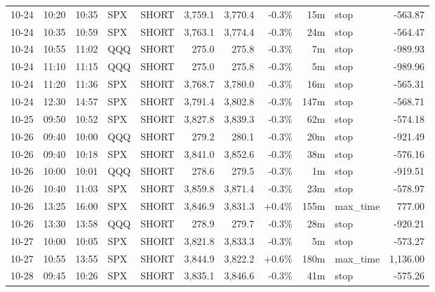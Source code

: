 \documentclass[11pt,a4paper,twoside]{article}
\begin{document}
\begin{center}
\begin{longtable}{>{\color{txtmain}}l l l l l r r r r >{\color{txtmain}}l r}
10-24 & 10:20 & 10:35 & SPX & SHORT & 3,759.1 & 3,770.4 & \textcolor{lossred}{-0.3\%} & 15m & stop & \textcolor{lossred}{-563.87} \\
10-24 & 10:35 & 10:59 & SPX & SHORT & 3,763.1 & 3,774.4 & \textcolor{lossred}{-0.3\%} & 24m & stop & \textcolor{lossred}{-564.47} \\
10-24 & 10:55 & 11:02 & QQQ & SHORT & 275.0 & 275.8 & \textcolor{lossred}{-0.3\%} & 7m & stop & \textcolor{lossred}{-989.93} \\
10-24 & 11:10 & 11:15 & QQQ & SHORT & 275.0 & 275.8 & \textcolor{lossred}{-0.3\%} & 5m & stop & \textcolor{lossred}{-989.96} \\
10-24 & 11:20 & 11:36 & SPX & SHORT & 3,768.7 & 3,780.0 & \textcolor{lossred}{-0.3\%} & 16m & stop & \textcolor{lossred}{-565.31} \\
10-24 & 12:30 & 14:57 & SPX & SHORT & 3,791.4 & 3,802.8 & \textcolor{lossred}{-0.3\%} & 147m & stop & \textcolor{lossred}{-568.71} \\
10-25 & 09:50 & 10:52 & SPX & SHORT & 3,827.8 & 3,839.3 & \textcolor{lossred}{-0.3\%} & 62m & stop & \textcolor{lossred}{-574.18} \\
10-26 & 09:40 & 10:00 & QQQ & SHORT & 279.2 & 280.1 & \textcolor{lossred}{-0.3\%} & 20m & stop & \textcolor{lossred}{-921.49} \\
10-26 & 09:40 & 10:18 & SPX & SHORT & 3,841.0 & 3,852.6 & \textcolor{lossred}{-0.3\%} & 38m & stop & \textcolor{lossred}{-576.16} \\
10-26 & 10:00 & 10:01 & QQQ & SHORT & 278.6 & 279.5 & \textcolor{lossred}{-0.3\%} & 1m & stop & \textcolor{lossred}{-919.51} \\
10-26 & 10:40 & 11:03 & SPX & SHORT & 3,859.8 & 3,871.4 & \textcolor{lossred}{-0.3\%} & 23m & stop & \textcolor{lossred}{-578.97} \\
10-26 & 13:25 & 16:00 & SPX & SHORT & 3,846.9 & 3,831.3 & \textcolor{wingreen}{+0.4\%} & 155m & max\_time & \textcolor{wingreen}{777.00} \\
10-26 & 13:30 & 13:58 & QQQ & SHORT & 278.9 & 279.7 & \textcolor{lossred}{-0.3\%} & 28m & stop & \textcolor{lossred}{-920.21} \\
10-27 & 10:00 & 10:05 & SPX & SHORT & 3,821.8 & 3,833.3 & \textcolor{lossred}{-0.3\%} & 5m & stop & \textcolor{lossred}{-573.27} \\
10-27 & 10:55 & 13:55 & SPX & SHORT & 3,844.9 & 3,822.2 & \textcolor{wingreen}{+0.6\%} & 180m & max\_time & \textcolor{wingreen}{1,136.00} \\
10-28 & 09:45 & 10:26 & SPX & SHORT & 3,835.1 & 3,846.6 & \textcolor{lossred}{-0.3\%} & 41m & stop & \textcolor{lossred}{-575.26} \\

\end{longtable}
\end{center}
\end{document}

